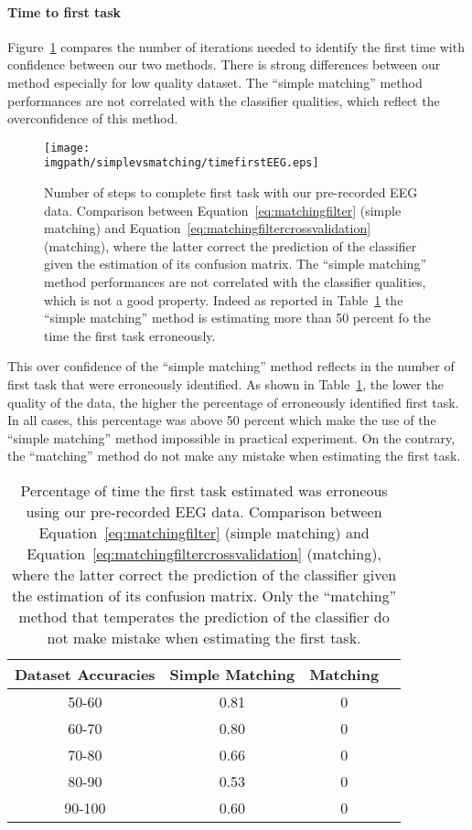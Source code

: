\paragraph{Time to first task} Figure~\ref{fig:timefirst_simplevsmatchingEEG} compares the number of iterations needed to identify the first time with confidence between our two methods. There is strong differences between our method especially for low quality dataset. The ``simple matching'' method performances are not correlated with the classifier qualities, which reflect the overconfidence of this method.

\begin{figure}[!ht]
\centering
\texttt{[image: \\imgpath/simplevsmatching/timefirstEEG.eps]}
\caption{Number of steps to complete first task with our pre-recorded EEG data. Comparison between Equation~\ref{eq:matchingfilter} (simple matching) and Equation~\ref{eq:matchingfiltercrossvalidation} (matching), where the latter correct the prediction of the classifier given the estimation of its confusion matrix. The ``simple matching'' method performances are not correlated with the classifier qualities, which is not a good property. Indeed as reported in Table~\ref{tab:errorTaskRatiosimplevsmatchingEEG} the ``simple matching'' method is estimating more than 50 percent fo the time the first task erroneously.}
\label{fig:timefirst_simplevsmatchingEEG}
\end{figure} 

This over confidence of the ``simple matching'' method reflects in the number of first task that were erroneously identified. As shown in Table~\ref{tab:errorTaskRatiosimplevsmatchingEEG}, the lower the quality of the data, the higher the percentage of erroneously identified first task. In all cases, this percentage was above 50 percent which make the use of the ``simple matching'' method impossible in practical experiment. On the contrary, the ``matching'' method do not make any mistake when estimating the first task.

\begin{table}[!ht]
\centering
{}
\begin{tabular}{c c c c}
    Dataset Accuracies & Simple Matching &  Matching \\ \hline
    50-60 & 0.81 & 0 \\ 
    60-70 & 0.80 & 0 \\
    70-80 & 0.66 & 0 \\
    80-90 & 0.53 & 0 \\
    90-100 & 0.60 & 0 \\
\end{tabular}
\caption{Percentage of time the first task estimated was erroneous using our pre-recorded EEG data. Comparison between Equation~\ref{eq:matchingfilter} (simple matching) and Equation~\ref{eq:matchingfiltercrossvalidation} (matching), where the latter correct the prediction of the classifier given the estimation of its confusion matrix. Only the ``matching'' method that temperates the prediction of the classifier do not make mistake when estimating the first task.}
\label{tab:errorTaskRatiosimplevsmatchingEEG}
\end{table}

